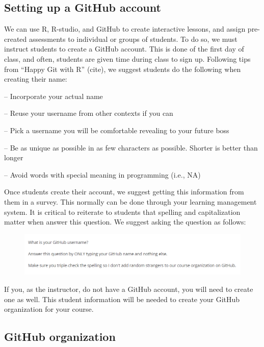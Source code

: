 \documentclass[
  12pt]{article}
\begin{document}
\hypertarget{setting-up-a-github-account}{%
\subsection{Setting up a GitHub
account}\label{setting-up-a-github-account}}

We can use R, R-studio, and GitHub to create interactive lessons, and
assign pre-created assessments to individual or groups of students. To
do so, we must instruct students to create a GitHub account. This is
done of the first day of class, and often, students are given time
during class to sign up. Following tips from ``Happy Git with R''
(cite), we suggest students do the following when creating their name:

-- Incorporate your actual name

-- Reuse your username from other contexts if you can

-- Pick a username you will be comfortable revealing to your future boss

-- Be as unique as possible in as few characters as possible. Shorter is
better than longer

-- Avoid words with special meaning in programming (i.e., NA)

Once students create their account, we suggest getting this information
from them in a survey. This normally can be done through your learning
management system. It is critical to reiterate to students that spelling
and capitalization matter when answer this question. We suggest asking
the question as follows:

\begin{figure}

{\centering \includegraphics{images/github.question.png}

}

\end{figure}

If you, as the instructor, do not have a GitHub account, you will need
to create one as well. This student information will be needed to create
your GitHub organization for your course.

\hypertarget{github-organization}{%
\subsection{GitHub organization}\label{github-organization}}
\end{document}
